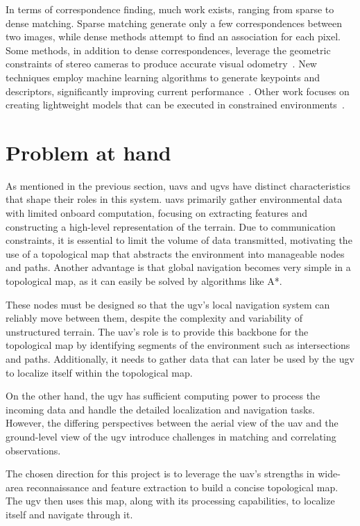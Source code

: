 In terms of correspondence finding, much work exists, ranging from sparse to dense matching.
Sparse matching generate only a few correspondences between two images, while dense methods attempt to find an association for each pixel.
Some methods, in addition to dense correspondences, leverage the geometric constraints of stereo cameras to produce accurate
visual odometry~\cite{comport_accurate_2007}.
New techniques employ machine learning algorithms to generate keypoints and descriptors, significantly improving current performance~\cite{jiang_omniglue_2024}.
Other work focuses on creating lightweight models that can be executed in constrained environments~\cite{potje_xfeat_2024}.

\section{Problem at hand}\label{sec:problem-at-hand}

As mentioned in the previous section, \glspl{uav} and \glspl{ugv} have distinct characteristics that shape their roles in this system.
\glspl{uav} primarily gather environmental data with limited onboard computation, focusing on extracting features and
constructing a high-level representation of the terrain.
Due to communication constraints, it is essential to limit the volume of data transmitted, motivating the use of a
topological map that abstracts the environment into manageable nodes and paths.
Another advantage is that global navigation becomes very simple in a topological map, as it can easily be solved by
algorithms like A*.

These nodes must be designed so that the \gls{ugv}’s local navigation system can reliably move between them, despite
the complexity and variability of unstructured terrain.
The \gls{uav}'s role is to provide this backbone for the topological map by identifying segments of the environment
such as intersections and paths.
Additionally, it needs to gather data that can later be used by the \gls{ugv} to localize itself within the topological map.

On the other hand, the \gls{ugv} has sufficient computing power to process the incoming data and handle the detailed
localization and navigation tasks.
However, the differing perspectives between the aerial view of the \gls{uav} and the ground-level view of the \gls{ugv}
introduce challenges in matching and correlating observations.

The chosen direction for this project is to leverage the \gls{uav}’s strengths in wide-area reconnaissance and feature
extraction to build a concise topological map.
The \gls{ugv} then uses this map, along with its processing capabilities, to localize itself and navigate through it.
